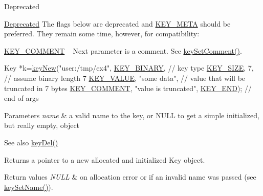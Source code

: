 \begin{DoxyRefDesc}{Deprecated}
\item[\hyperlink{deprecated__deprecated000002}{Deprecated}]The flags below are deprecated and \hyperlink{group__key_gga9b703ca49f48b482def322b77d3e6bc8a040582834bb2d90049947d7ef74e87e2}{K\+E\+Y\+\_\+\+M\+E\+TA} should be preferred. They remain some time, however, for compatibility\+: 
\begin{DoxyCodeInclude}
\end{DoxyCodeInclude}

\begin{DoxyItemize}
\item \hyperlink{group__key_gga9b703ca49f48b482def322b77d3e6bc8ac29427bb47cc31689d02912e36161ee3}{K\+E\+Y\+\_\+\+C\+O\+M\+M\+E\+NT} ~\newline
 Next parameter is a comment. See \hyperlink{group__meta_ga8863a877a84fa46e6017fe72e49b89c1}{key\+Set\+Comment()}. 
\begin{DoxyCodeInclude}
Key *k=\hyperlink{group__key_gad23c65b44bf48d773759e1f9a4d43b89}{keyNew}(\textcolor{stringliteral}{"user:/tmp/ex4"},
        \hyperlink{group__key_gga9b703ca49f48b482def322b77d3e6bc8a1ca18d4e094ae7487d35ecedda2235ff}{KEY\_BINARY},                   \textcolor{comment}{// key type}
        \hyperlink{group__key_gga9b703ca49f48b482def322b77d3e6bc8a6d531b5c41445d19d0452eebdccbfa01}{KEY\_SIZE}, 7,                    \textcolor{comment}{// assume binary length 7}
        \hyperlink{group__key_gga9b703ca49f48b482def322b77d3e6bc8ac66e4a49d09212b79f5754ca6db5bd2e}{KEY\_VALUE}, \textcolor{stringliteral}{"some data"},                \textcolor{comment}{// value that will be truncated in 7 bytes}
        \hyperlink{group__key_gga9b703ca49f48b482def322b77d3e6bc8ac29427bb47cc31689d02912e36161ee3}{KEY\_COMMENT}, \textcolor{stringliteral}{"value is truncated"},
        \hyperlink{group__key_gga9b703ca49f48b482def322b77d3e6bc8aa8adb6fcb92dec58fb19410eacfdd403}{KEY\_END});                        \textcolor{comment}{// end of args}
\end{DoxyCodeInclude}

\end{DoxyItemize}\end{DoxyRefDesc}



\begin{DoxyParams}{Parameters}
{\em name} & a valid name to the key, or N\+U\+LL to get a simple initialized, but really empty, object \\
\hline
\end{DoxyParams}
\begin{DoxySeeAlso}{See also}
\hyperlink{group__key_ga3df95bbc2494e3e6703ece5639be5bb1}{key\+Del()} 
\end{DoxySeeAlso}
\begin{DoxyReturn}{Returns}
a pointer to a new allocated and initialized Key object. 
\end{DoxyReturn}

\begin{DoxyRetVals}{Return values}
{\em N\+U\+LL} & on allocation error or if an invalid {\ttfamily name} was passed (see \hyperlink{group__keyname_ga7699091610e7f3f43d2949514a4b35d9}{key\+Set\+Name()}). \\
\hline
\end{DoxyRetVals}
